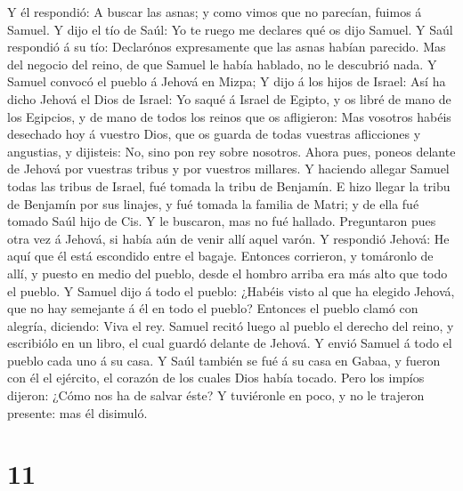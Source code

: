 Y él respondió: A buscar las asnas; y como vimos que no parecían, fuimos
á Samuel.  Y dijo el tío de Saúl: Yo te ruego me declares
qué os dijo Samuel.  Y Saúl respondió á su tío: Declarónos
expresamente que las asnas habían parecido. Mas del negocio del reino,
de que Samuel le había hablado, no le descubrió nada.  Y
Samuel convocó el pueblo á Jehová en Mizpa;  Y dijo á los
hijos de Israel: Así ha dicho Jehová el Dios de Israel: Yo saqué á
Israel de Egipto, y os libré de mano de los Egipcios, y de mano de todos
los reinos que os afligieron:  Mas vosotros habéis
desechado hoy á vuestro Dios, que os guarda de todas vuestras
aflicciones y angustias, y dijisteis: No, sino pon rey sobre nosotros.
Ahora pues, poneos delante de Jehová por vuestras tribus y por vuestros
millares.  Y haciendo allegar Samuel todas las tribus de
Israel, fué tomada la tribu de Benjamín.  E hizo llegar la
tribu de Benjamín por sus linajes, y fué tomada la familia de Matri; y
de ella fué tomado Saúl hijo de Cis. Y le buscaron, mas no fué hallado.
 Preguntaron pues otra vez á Jehová, si había aún de venir
allí aquel varón. Y respondió Jehová: He aquí que él está escondido
entre el bagaje.  Entonces corrieron, y tomáronlo de allí,
y puesto en medio del pueblo, desde el hombro arriba era más alto que
todo el pueblo.  Y Samuel dijo á todo el pueblo: ¿Habéis
visto al que ha elegido Jehová, que no hay semejante á él en todo el
pueblo? Entonces el pueblo clamó con alegría, diciendo: Viva el rey.
 Samuel recitó luego al pueblo el derecho del reino, y
escribiólo en un libro, el cual guardó delante de Jehová. 
Y envió Samuel á todo el pueblo cada uno á su casa. Y Saúl también se
fué á su casa en Gabaa, y fueron con él el ejército, el corazón de los
cuales Dios había tocado.  Pero los impíos dijeron: ¿Cómo
nos ha de salvar éste? Y tuviéronle en poco, y no le trajeron presente:
mas él disimuló.

\hypertarget{section-10}{%
\section{11}\label{section-10}}

